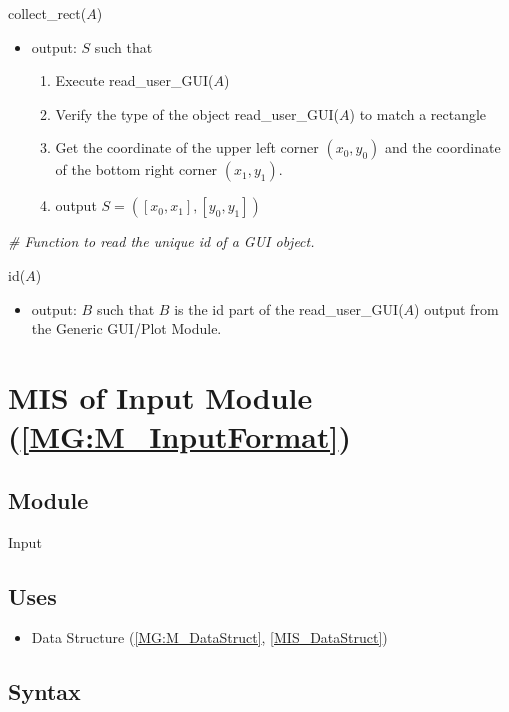 \documentclass[12pt, titlepage]{article}
\begin{document}
\noindent collect{\_}rect($A$)
\begin{itemize}
\item output: $S$ such that
	\begin{enumerate}
	\item Execute read{\_}user{\_}GUI($A$)
	\item Verify the type of the object read{\_}user{\_}GUI($A$) to match a 
rectangle
	\item Get the coordinate of the upper left corner $(x_0,y_0)$ and the 
coordinate of the bottom right corner $(x_1,y_1)$. 
	\item output $S=([x_0,x_1],[y_0,y_1])$
	\end{enumerate} 
\end{itemize}
\bigskip

\noindent\textit{{\#} Function to read the unique id of a GUI object.} \medskip

\noindent id($A$)
\begin{itemize}
\item output: $B$ such that $B$ is the id part of the read{\_}user{\_}GUI($A$) 
output from the Generic GUI/Plot Module.
\end{itemize}
\bigskip

\section{MIS of Input Module (\texorpdfstring{\cref{MG:M_InputFormat}}))} 
\label{MIS_Input}



\subsection{Module}
Input
\subsection{Uses}
\begin{itemize}
\item Data Structure (\cref{MG:M_DataStruct}, \cref{MIS_DataStruct})
\end{itemize}

\subsection{Syntax}
\end{document}
